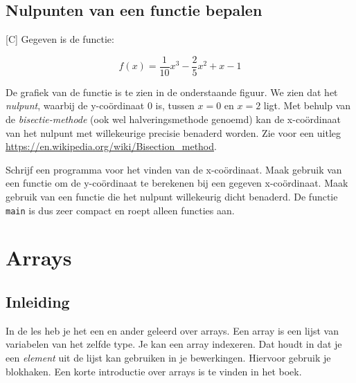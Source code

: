 \documentclass[a4paper,10pt,fleqn,twoside]{article}
\begin{document}
\subsection{Nulpunten van een functie bepalen}[C]
Gegeven is de functie:

\begin{equation}
f(x) = \frac{1}{10}x^3 - \frac{2}{5}x^2 + x - 1
\end{equation}

De grafiek van de functie is te zien in de onderstaande figuur. We zien dat het \textsl{nulpunt}, waarbij de y-co\"ordinaat 0 is, tussen $x=0$ en $x=2$ ligt. Met behulp van de \textsl{bisectie-methode} (ook wel halveringsmethode genoemd) kan de x-coördinaat van het nulpunt met willekeurige precisie benaderd worden. Zie voor een uitleg \url{https://en.wikipedia.org/wiki/Bisection_method}.

\begin{figure}[!ht]
\centering
{}
\end{figure}

Schrijf een programma voor het vinden van de x-coördinaat. Maak gebruik van een functie om de y-coördinaat te berekenen bij een gegeven x-coördinaat. Maak gebruik van een functie die het nulpunt willekeurig dicht benaderd. De functie \lstinline|main| is dus zeer compact en roept alleen functies aan.


\clearpage
\section{Arrays}

\subsection{Inleiding}
\label{sec:inleidingarray}
In de les heb je het een en ander geleerd over arrays.
Een array is een lijst van variabelen van het zelfde type. Je kan een array indexeren. Dat houdt in dat je een \textsl{element} uit de lijst kan gebruiken in je bewerkingen. Hiervoor gebruik je blokhaken. Een korte introductie over arrays is te vinden in het boek.
\end{document}
